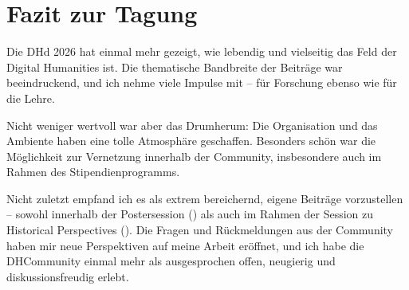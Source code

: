 \documentclass[letterpaper,10pt,english]{jupyterBook}
\begin{document}
\chapter{Fazit zur Tagung}
\label{\detokenize{tagung/fazit:fazit-zur-tagung}}\label{\detokenize{tagung/fazit::doc}}
\sphinxAtStartPar
Die DHd 2026 hat einmal mehr gezeigt, wie lebendig und vielseitig das Feld der Digital Humanities ist. Die thematische Bandbreite der Beiträge war beeindruckend, und ich nehme viele Impulse mit – für Forschung ebenso wie für die Lehre.

\sphinxAtStartPar
Nicht weniger wertvoll war aber das Drumherum: Die Organisation und das Ambiente haben eine tolle Atmosphäre geschaffen. Besonders schön war die Möglichkeit zur Vernetzung innerhalb der Community, insbesondere auch im Rahmen des Stipendienprogramms.

\sphinxAtStartPar
Nicht zuletzt empfand ich es als extrem bereichernd, eigene Beiträge vorzustellen – sowohl innerhalb der Postersession () als auch im Rahmen der Session zu Historical Perspectives (). Die Fragen und Rückmeldungen aus der Community haben mir neue Perspektiven auf meine Arbeit eröffnet, und ich habe die DH\sphinxhyphen{}Community einmal mehr als ausgesprochen offen, neugierig und diskussionsfreudig erlebt.
\end{document}
